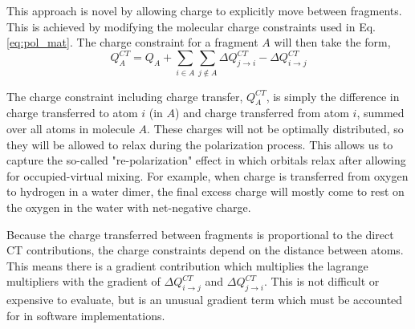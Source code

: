 \documentclass[journal=jctcce,manuscript=article]{achemso}
\begin{document}
This approach is novel by allowing charge to explicitly move between fragments. This is achieved by modifying the molecular charge constraints used in Eq. \ref{eq:pol_mat}. The charge constraint for a fragment $A$ will then take the form,
\begin{equation}
  Q^{CT}_A=Q_A+\sum_{i\in A}\sum_{j\notin A}\Delta Q^{CT}_{j\rightarrow i}-\Delta Q^{CT}_{i\rightarrow j}
  \label{eq:charge_constraint}
\end{equation}

The charge constraint including charge transfer, $Q^{CT}_A$, is simply the difference in charge transferred to atom $i$ (in $A$) and charge transferred from atom $i$, summed over all atoms in molecule $A$. These charges will not be optimally distributed, so they will be allowed to relax during the polarization process. This allows us to capture the so-called "re-polarization"\cite{khaliullin2007unravelling} effect in which orbitals relax after allowing for occupied-virtual mixing. For example, when charge is transferred from oxygen to hydrogen in a water dimer, the final excess charge will mostly come to rest on the oxygen in the water with net-negative charge.

Because the charge transferred between fragments is proportional to the direct CT contributions, the charge constraints depend on the distance between atoms. This means there is a gradient contribution which multiplies the lagrange multipliers with the gradient of $\Delta Q^{CT}_{i\rightarrow j}$ and $\Delta Q^{CT}_{j\rightarrow i}$. This is not difficult or expensive to evaluate, but is an  unusual gradient term which must be accounted for in software implementations.
\end{document}
